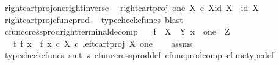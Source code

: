 \begin{isabellebody}
\endisatagproof
{\isafoldproof}%
%
\isadelimproof
\isanewline
%
\endisadelimproof
\isanewline
{}\isamarkupfalse%
\ right{\isacharunderscore}{\kern0pt}cart{\isacharunderscore}{\kern0pt}proj{\isacharunderscore}{\kern0pt}one{\isacharunderscore}{\kern0pt}right{\isacharunderscore}{\kern0pt}inverse{\isacharcolon}{\kern0pt}\isanewline
\ \ {\isachardoublequoteopen}right{\isacharunderscore}{\kern0pt}cart{\isacharunderscore}{\kern0pt}proj\ one\ X\ {\isasymcirc}\isactrlsub c\ {\isasymlangle}{\isasymbeta}\isactrlbsub X\isactrlesub {\isacharcomma}{\kern0pt}id\ X{\isasymrangle}\ {\isacharequal}{\kern0pt}\ id\ X{\isachardoublequoteclose}\isanewline
%
\isadelimproof
\ \ %
\endisadelimproof
%
\isatagproof
{}\isamarkupfalse%
\ right{\isacharunderscore}{\kern0pt}cart{\isacharunderscore}{\kern0pt}proj{\isacharunderscore}{\kern0pt}cfunc{\isacharunderscore}{\kern0pt}prod\ \isamarkupfalse%
\ {\isacharparenleft}{\kern0pt}typecheck{\isacharunderscore}{\kern0pt}cfuncs{\isacharcomma}{\kern0pt}\ blast{\isacharparenright}{\kern0pt}%
\endisatagproof
{\isafoldproof}%
%
\isadelimproof
\isanewline
%
\endisadelimproof
\isanewline
{}\isamarkupfalse%
\ cfunc{\isacharunderscore}{\kern0pt}cross{\isacharunderscore}{\kern0pt}prod{\isacharunderscore}{\kern0pt}right{\isacharunderscore}{\kern0pt}terminal{\isacharunderscore}{\kern0pt}decomp{\isacharcolon}{\kern0pt}\isanewline
\ \ \ {\isachardoublequoteopen}f\ {\isacharcolon}{\kern0pt}\ X\ {\isasymrightarrow}\ Y{\isachardoublequoteclose}\ {\isachardoublequoteopen}x\ {\isacharcolon}{\kern0pt}\ one\ {\isasymrightarrow}\ Z{\isachardoublequoteclose}\isanewline
\ \ \ {\isachardoublequoteopen}f\ {\isasymtimes}\isactrlsub f\ x\ {\isacharequal}{\kern0pt}\ {\isasymlangle}f{\isacharcomma}{\kern0pt}\ x\ {\isasymcirc}\isactrlsub c\ {\isasymbeta}\isactrlbsub X\isactrlesub {\isasymrangle}\ {\isasymcirc}\isactrlsub c\ left{\isacharunderscore}{\kern0pt}cart{\isacharunderscore}{\kern0pt}proj\ X\ one{\isachardoublequoteclose}\isanewline
%
\isadelimproof
\ \ %
\endisadelimproof
%
\isatagproof
{}\isamarkupfalse%
\ assms\ \isamarkupfalse%
\ {\isacharparenleft}{\kern0pt}typecheck{\isacharunderscore}{\kern0pt}cfuncs{\isacharcomma}{\kern0pt}\ smt\ {\isacharparenleft}{\kern0pt}z{}{\isacharparenright}{\kern0pt}\ cfunc{\isacharunderscore}{\kern0pt}cross{\isacharunderscore}{\kern0pt}prod{\isacharunderscore}{\kern0pt}def\ cfunc{\isacharunderscore}{\kern0pt}prod{\isacharunderscore}{\kern0pt}comp\ cfunc{\isacharunderscore}{\kern0pt}type{\isacharunderscore}{\kern0pt}def\isanewline

\end{isabellebody}
